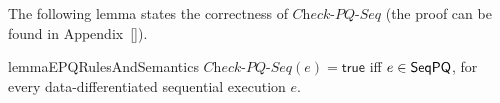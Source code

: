 %
%
%
%
%
%
%
%
%

The following lemma states the correctness of $\textit{Check-PQ-Seq}$ (the proof can be found in Appendix~\ref{}).

\begin{restatable}{lemma}{EPQRulesAndSemantics}
\label{lemma:EPQ rules and semantics}
$\textit{Check-PQ-Seq}(e)=\mathsf{true}$ iff $e\in \mathsf{SeqPQ}$, for every data-differentiated sequential execution $e$.
\end{restatable}

%


